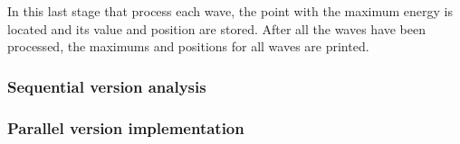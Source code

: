 In this last stage that process each wave, the
point with the maximum energy is located and its value and position are stored.
After all the waves have been processed, the maximums and positions for all waves
are printed.
\subsubsection{Sequential version analysis}

\subsubsection{Parallel version implementation}